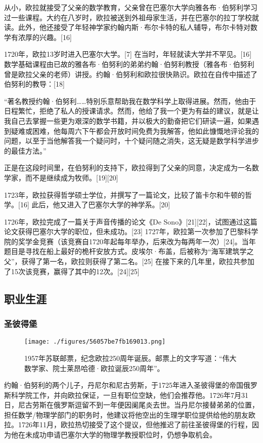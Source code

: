 从小，欧拉就接受了父亲的数学教育，父亲曾在巴塞尔大学向雅各布·伯努利学习过一些课程。大约在八岁时，欧拉被送到外祖母家生活，并在巴塞尔的拉丁学校就读。此外，他还接受了年轻神学家约翰内斯·布尔卡特的私人辅导，布尔卡特对数学有浓厚的兴趣。[16]

1720年，欧拉13岁时进入巴塞尔大学。[7] 在当时，年轻就读大学并不罕见。[16] 数学基础课程由已故的雅各布·伯努利的弟弟约翰·伯努利教授（雅各布·伯努利曾是欧拉父亲的老师）讲授。约翰·伯努利和欧拉很快熟识。欧拉在自传中描述了伯努利的教导：[18]

“著名教授约翰·伯努利……特别乐意帮助我在数学科学上取得进展。然而，他由于日程繁忙，拒绝了私人的授课请求。然而，他给了我一个更为有益的建议，就是让我自己去掌握一些更为艰深的数学书籍，并以极大的勤奋把它们研读一遍，如果遇到疑难或困难，他每周六下午都会开放时间免费为我解答，他如此慷慨地评论我的问题，以至于当他解答我一个疑问时，十个疑问随之消失，这无疑是数学科学进步的最佳方法。”

正是在这段时间里，在伯努利的支持下，欧拉得到了父亲的同意，决定成为一名数学家，而不是继续成为牧师。[19][20]

1723年，欧拉获得哲学硕士学位，并撰写了一篇论文，比较了笛卡尔和牛顿的哲学。[16] 此后，他又进入了巴塞尔大学的神学系。[20]

1726年，欧拉完成了一篇关于声音传播的论文《De Sono》[21][22]，试图通过这篇论文获得巴塞尔大学的职位，但未成功。[23] 1727年，欧拉第一次参加了巴黎科学院的奖学金竞赛（该竞赛自1720年起每年举办，后来改为每两年一次）[24]。当年题目是寻找在船上最好的桅杆安放方式。皮埃尔·布盖，后被称为“海军建筑学之父”，获得了第一名，欧拉则获得了第二名。[25] 在接下来的几年里，欧拉共参加了15次该竞赛，赢得了其中的12次。[24][25]
\subsection{职业生涯}
\subsubsection{圣彼得堡}
\begin{figure}[ht]
\centering
\texttt{[image: ./figures/56057be7fb169013.png]}
\caption{1957年苏联邮票，纪念欧拉250周年诞辰。邮票上的文字写道：“伟大数学家、院士莱昂哈德·欧拉诞辰250周年”。} \label{fig_OL1_1}
\end{figure}
约翰·伯努利的两个儿子，丹尼尔和尼古劳斯，于1725年进入圣彼得堡的帝国俄罗斯科学院工作，并向欧拉保证，一旦有职位空缺，他们会推荐他。1726年7月31日，尼古劳斯在俄罗斯逗留不到一年便因阑尾炎去世。当丹尼尔接替弟弟的位置，担任数学/物理学部门的职务时，他建议将他空出的生理学职位提供给他的朋友欧拉。1726年11月，欧拉热切接受了这个提议，但他推迟了前往圣彼得堡的行程，因为他在未成功申请巴塞尔大学的物理学教授职位时，仍想争取机会。

